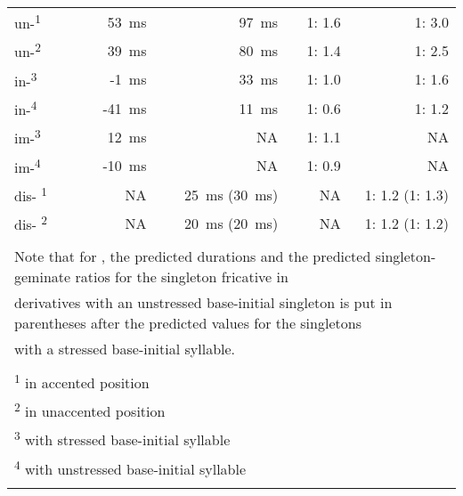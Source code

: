 \begin{table}
{\begin{tabular} {lrrrr}
				\midrule			
				{un-}\textsuperscript{1}& 53~ms & 97~ms   &  1: 1.6&1: 3.0\\ 
				{un-}\textsuperscript{2}& 39~ms & 80~ms   & 1: 1.4&1: 2.5\\ 
				
				{in-}\textsuperscript{3}&-1~ms &33~ms&1: 1.0&1: 1.6\\ 
				{in-}\textsuperscript{4}&-41~ms &11~ms&  1: 0.6& 1: 1.2\\ 
				
				{im-}\textsuperscript{3}&12~ms &NA  &  1: 1.1&NA \\ 
				{im-}\textsuperscript{4}&-10~ms &NA  & 1: 0.9 & NA\\ 
				
				{dis-} \textsuperscript{1}&NA & 25~ms  (30~ms)&NA &1: 1.2 (1: 1.3)   \\
				{dis-} \textsuperscript{2}&NA & 20~ms  (20~ms)& NA& 1: 1.2 (1: 1.2) \\
				
				
				\midrule
				\\
				\multicolumn{5}{l}{ \footnotesize{Note that for \prefix{dis}, the predicted durations and the predicted singleton-{geminate} ratios for the singleton fricative in}}\\
				\multicolumn{5}{l}{ \footnotesize{derivatives with an unstressed base-initial singleton is put in parentheses after the predicted values for the singletons}}\\
				\multicolumn{5}{l}{ \footnotesize{with a {stressed} base-initial syllable.}}\\
				\\				
				\multicolumn{5}{l}{\textsuperscript{1} \footnotesize{in {accented} position}}\\
				\multicolumn{5}{l}{\textsuperscript{2} \footnotesize{in unaccented position}}\\
				\multicolumn{5}{l}{\textsuperscript{3} \footnotesize{with {stressed} base-initial syllable}}\\
				\multicolumn{5}{l}{\textsuperscript{4} \footnotesize{with unstressed base-initial syllable}}\\

			\lspbottomrule 
			\end{tabular}}
\end{table}
